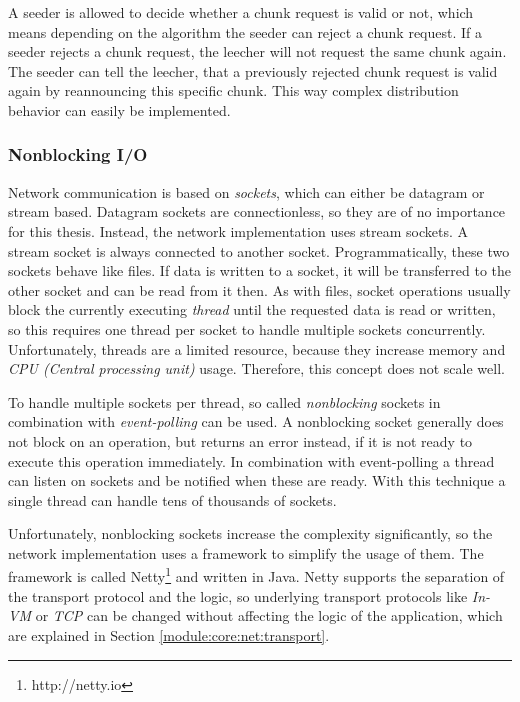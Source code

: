 A seeder is allowed to decide whether a chunk request is valid or not, which means depending on the algorithm the seeder can reject a chunk request. If a seeder rejects a chunk request, the leecher will not request the same chunk again. The seeder can tell the leecher, that a previously rejected chunk request is valid again by reannouncing this specific chunk. This way complex distribution behavior can easily be implemented.


\subsubsection{Nonblocking I/O}
Network communication is based on \emph{sockets}, which can either be datagram or stream based. Datagram sockets are connectionless, so they are of no importance for this thesis. Instead, the network implementation uses stream sockets. A stream socket is always connected to another socket. Programmatically, these two sockets behave like files. If data is written to a socket, it will be transferred to the other socket and can be read from it then. As with files, socket operations usually block the currently executing \emph{thread} until the requested data is read or written, so this requires one thread per socket to handle multiple sockets concurrently. Unfortunately, threads are a limited resource, because they increase memory and \emph{CPU (Central processing unit)} usage. Therefore, this concept does not scale well.

\vfill
\pagebreak

To handle multiple sockets per thread, so called \emph{nonblocking} sockets in combination with \emph{event-polling} can be used. A nonblocking socket generally does not block on an operation, but returns an error instead, if it is not ready to execute this operation immediately. In combination with event-polling a thread can listen on sockets and be notified when these are ready. With this technique a single thread can handle tens of thousands of sockets.

Unfortunately, nonblocking sockets increase the complexity significantly, so the network implementation uses a framework to simplify the usage of them. The framework is called Netty\footnote{http://netty.io} and written in Java. Netty supports the separation of the transport protocol and the logic, so underlying transport protocols like \emph{In-VM} or \emph{TCP} can be changed without affecting the logic of the application, which are explained in Section \ref{module:core:net:transport}.

